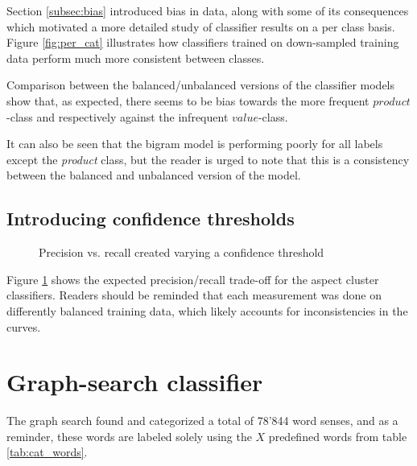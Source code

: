 \documentclass[a4paper,11pt]{kth-mag}
\begin{document}
Section \ref{subsec:bias} introduced bias in data, along with some of its
consequences which motivated a more detailed study of classifier results on
a per class basis. Figure \ref{fig:per_cat} illustrates how classifiers trained on
down-sampled training data perform much more consistent between classes.

Comparison between the balanced/unbalanced versions of the classifier models show that, as expected, there seems to be bias towards the more frequent $product$-class and respectively against the infrequent $value$-class.

It can also be seen that the bigram model is performing poorly for all labels except the \emph{product} class, but the reader is urged to note that this is a consistency between the balanced and unbalanced version of the model.

\newpage

\subsection{Introducing confidence thresholds}
\begin{figure}[h]
  \centering
  \caption{Precision vs. recall created varying a confidence threshold}
  \label{fig:pr_curve}
\end{figure}


Figure \ref{fig:pr_curve} shows the expected precision/recall trade-off for the aspect cluster classifiers. Readers should be reminded that each measurement was done on differently balanced training data, which likely accounts for inconsistencies in the curves.

\newpage

\section{Graph-search classifier}
The graph search found and categorized a total of 78'844 word senses, and as a reminder,
these words are labeled solely using the $X$ predefined words from table \ref{tab:cat_words}.
\end{document}
